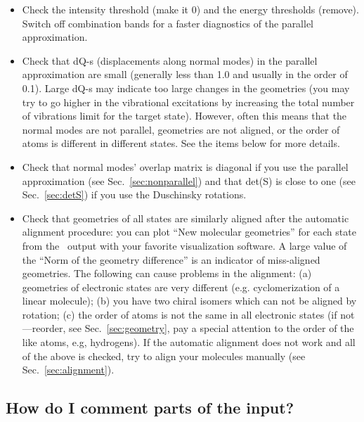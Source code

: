 \documentclass[11pt]{article}
\begin{document}
\begin{itemize}

\item Check the intensity threshold (make it 0) and the energy thresholds (remove). 
Switch off combination bands for a faster diagnostics of the parallel approximation.

\item Check that dQ-s (displacements along normal modes) in the parallel approximation are small
(generally less than 1.0 and usually in the order of 0.1). 
Large dQ-s may indicate too large changes in the geometries 
(you may try to go higher in the vibrational excitations by
increasing the total number of vibrations limit for the target state).
However, often this means that the normal modes are not parallel, geometries are not aligned,
or the order of atoms is different in different states. See the items below for more details.

\item Check that normal modes' overlap matrix is diagonal if you use the parallel approximation (see Sec.~\ref{sec:nonparallel})
and that det(S) is close to one (see Sec.~\ref{sec:detS}) if you use the Duschinsky rotations.

\item Check that geometries of all states are similarly aligned after 
the automatic alignment procedure: you can plot ``New molecular geometries'' for each state
from the \ezFCF\ output with your favorite visualization software. 
A large value of the ``Norm of the geometry difference'' is an indicator of miss-aligned geometries.
The following can cause problems in the alignment:
(a) geometries of electronic states are very different (e.g. cyclomerization of a linear molecule);
(b) you have two chiral isomers which can not be aligned by rotation;
(c) the order of atoms is not the same in all electronic states
(if not---reorder, see Sec.~\ref{sec:geometry}, 
pay a special attention to the order of the like atoms, e.g, hydrogens).
If the automatic alignment does not work and all of the above is checked, try to align
your molecules manually (see Sec.~\ref{sec:alignment}).
\end{itemize}


\subsection{How do I comment parts of the input?}
\label{sec:comments}
\end{document}
